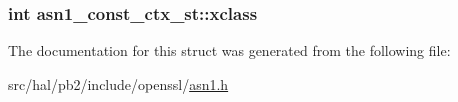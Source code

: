 \subsubsection[{\texorpdfstring{xclass}{xclass}}]{\setlength{\rightskip}{0pt plus 5cm}int asn1\+\_\+const\+\_\+ctx\+\_\+st\+::xclass}\hypertarget{structasn1__const__ctx__st_ae7e37b4b1a3f13d4b220f7ddf084b662}{}\label{structasn1__const__ctx__st_ae7e37b4b1a3f13d4b220f7ddf084b662}


The documentation for this struct was generated from the following file\+:\begin{DoxyCompactItemize}
\item 
src/hal/pb2/include/openssl/\hyperlink{asn1_8h}{asn1.\+h}\end{DoxyCompactItemize}
